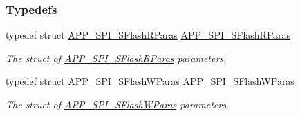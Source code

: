 \subsubsection*{Typedefs}
\begin{DoxyCompactItemize}
\item 
typedef struct \hyperlink{struct_a_p_p___s_p_i___s_flash_r_paras}{A\+P\+P\+\_\+\+S\+P\+I\+\_\+\+S\+Flash\+R\+Paras} \hyperlink{group___s_p_i___s_e_r_i_a_l___f_l_a_s_h_ga522f02a70a46a74d4e49fb44a8a7667c}{A\+P\+P\+\_\+\+S\+P\+I\+\_\+\+S\+Flash\+R\+Paras}\hypertarget{group___s_p_i___s_e_r_i_a_l___f_l_a_s_h_ga522f02a70a46a74d4e49fb44a8a7667c}{}\label{group___s_p_i___s_e_r_i_a_l___f_l_a_s_h_ga522f02a70a46a74d4e49fb44a8a7667c}

\begin{DoxyCompactList}\small\item\em The struct of \hyperlink{struct_a_p_p___s_p_i___s_flash_r_paras}{A\+P\+P\+\_\+\+S\+P\+I\+\_\+\+S\+Flash\+R\+Paras} parameters. \end{DoxyCompactList}\item 
typedef struct \hyperlink{struct_a_p_p___s_p_i___s_flash_w_paras}{A\+P\+P\+\_\+\+S\+P\+I\+\_\+\+S\+Flash\+W\+Paras} \hyperlink{group___s_p_i___s_e_r_i_a_l___f_l_a_s_h_gac18dcd3f831c00a0ddb2b69fb2a7ad89}{A\+P\+P\+\_\+\+S\+P\+I\+\_\+\+S\+Flash\+W\+Paras}\hypertarget{group___s_p_i___s_e_r_i_a_l___f_l_a_s_h_gac18dcd3f831c00a0ddb2b69fb2a7ad89}{}\label{group___s_p_i___s_e_r_i_a_l___f_l_a_s_h_gac18dcd3f831c00a0ddb2b69fb2a7ad89}

\begin{DoxyCompactList}\small\item\em The struct of \hyperlink{struct_a_p_p___s_p_i___s_flash_w_paras}{A\+P\+P\+\_\+\+S\+P\+I\+\_\+\+S\+Flash\+W\+Paras} parameters. \end{DoxyCompactList}\end{DoxyCompactItemize}
